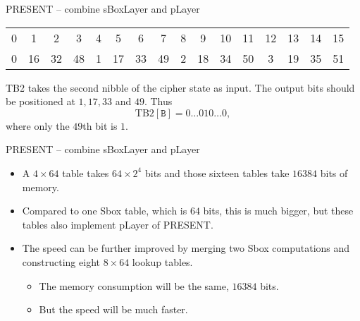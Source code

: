 \begin{frame}{PRESENT -- combine sBoxLayer and pLayer}
\begin{table}
\centering
\begin{tabular}{cccccccccccccccc}\hline
0 & 1 & 2 & 3 & 4 & 5 & 6 & 7 & 8 & 9 & 10 & 11 & 12 & 13 & 14 & 15 \\
0 & 16 & 32 & 48 & 1 & 17 & 33 & 49 & 2 & 18 & 34 & 50 & 3 & 19 & 35 & 51 \\\hline
\end{tabular}
\end{table}
\begin{example}
TB2 takes the second nibble of the cipher state as input.
The output bits should be positioned at $1,17,33$ and $49$.
Thus
\[
\text{TB2}[\texttt{B}]=0\dots010\dots0,
\]
where only the $49$th bit is $1$.
\end{example}
\end{frame}

\begin{frame}{PRESENT -- combine sBoxLayer and pLayer}
    \begin{itemize}
        \item A $4\times64$ table takes $64\times2^4$ bits and those sixteen tables take $16384$ bits of memory.
        \item Compared to one Sbox table, which is $64$ bits, this is much bigger, but these tables also implement pLayer of PRESENT.
       \item The speed can be further improved by merging two Sbox computations and constructing eight $8\times64$ lookup tables.
       \begin{itemize}
           \item The memory consumption will be the same, $16384$ bits.
           \item But the speed will be much faster.
       \end{itemize}
    \end{itemize}
\end{frame}